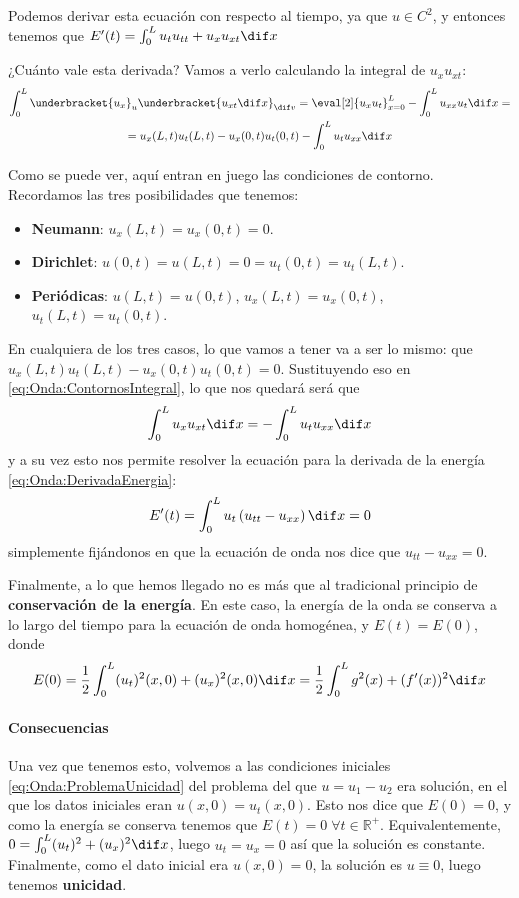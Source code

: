 		Podemos derivar esta ecuación con respecto al tiempo, ya que $u ∈ C^2$, y entonces tenemos que  \( E'(t) = \int_{0}^L u_t u_{tt} + u_x u_{xt} \dif x \label{eq:Onda:DerivadaEnergia} \)

		¿Cuánto vale esta derivada? Vamos a verlo calculando la integral de $u_x u_{xt}$:
		\begin{multline}
		\int_0^L \underbracket{u_x}_u \underbracket{u_{xt} \dif x}_{\dif v} = \eval[2]{u_x u_t}_{x= 0}^L - \int_0^L u_{xx} u_t \dif x = \\
		= u_x(L,t) u_t(L, t) - u_x(0,t) u_t(0,t) - \int_0^L u_t u_{xx} \dif x \label{eq:Onda:ContornosIntegral}
		\end{multline}

		Como se puede ver, aquí entran en juego las condiciones de contorno. Recordamos las tres posibilidades que tenemos:

		\begin{itemize}[itemsep = 0pt]
		\item \textbf{Neumann}: $u_x(L, t) = u_x(0,t) = 0$.
		\item \textbf{Dirichlet}: $u(0,t) = u(L, t) = 0 = u_t(0,t) = u_t(L, t)$.
		\item \textbf{Periódicas}: $u(L, t) = u(0,t)$, $u_x(L, t) = u_x(0,t)$, $u_t(L, t) = u_t(0,t)$.
		\end{itemize}

		En cualquiera de los tres casos, lo que vamos a tener va a ser lo mismo: que $u_x(L,t) u_t(L, t) - u_x(0,t) u_t(0,t) = 0$. Sustituyendo eso en \eqref{eq:Onda:ContornosIntegral}, lo que nos quedará será que \[ \int_0^L u_x u_{xt} \dif x = - \int_{0}^L u_t u_{xx} \dif x \] y a su vez esto nos permite resolver la ecuación para la derivada de la energía \eqref{eq:Onda:DerivadaEnergia}:
		\[ E'(t) = \int_0^L u_t \left(u_{tt} - u_{xx} \right) \dif x = 0\]
		simplemente fijándonos en que la ecuación de onda nos dice que $u_{tt} - u_{xx} = 0$.

		Finalmente, a lo que hemos llegado no es más que al tradicional principio de \textbf{conservación de la energía}. En este caso, la energía de la onda se conserva a lo largo del tiempo para la ecuación de onda homogénea, y $E(t) = E(0)$, donde
		\[ E(0) = \frac{1}{2} \int_0^L (u_t)^2 (x,0) + (u_x)^2 (x,0) \dif x = \frac{1}{2} \int_0^L g^2(x)+(f'(x))^2 \dif x \]

		\paragraph{Consecuencias} Una vez que tenemos esto, volvemos a las condiciones iniciales \eqref{eq:Onda:ProblemaUnicidad} del problema del que $u = u_1 - u_2$ era solución, en el que los datos iniciales eran $u(x,0) = u_t(x,0)$. Esto nos dice que $E(0) = 0$, y como la energía se conserva tenemos que $E(t) = 0\;∀t ∈ ℝ^+$. Equivalentemente, $0 = \int_0^L (u_t)^2 + (u_x)^2 \dif x$, luego $u_t = u_x = 0$ así que la solución es constante. Finalmente, como el dato inicial era $u(x,0) = 0$, la solución es $u \equiv 0$, luego tenemos \textbf{unicidad}.

